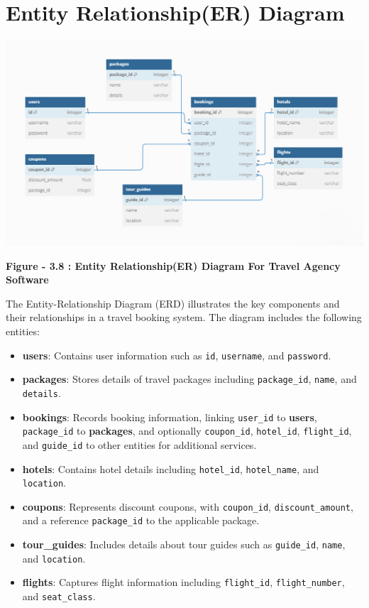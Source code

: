 \documentclass{scrreprt}
\begin{document}
\section{Entity Relationship(ER) Diagram}

{\includegraphics[width=\textwidth]{erd.png}}

\begin{center}
    \parbox{0.8\textwidth}{ 
        \centering
        \textbf{Figure - 3.8 : Entity Relationship(ER) Diagram For Travel Agency Software}
    }
\end{center}

The Entity-Relationship Diagram (ERD) illustrates the key components and their relationships in a travel booking system. The diagram includes the following entities:

\begin{itemize}
    \item \textbf{users}: Contains user information such as \texttt{id}, \texttt{username}, and \texttt{password}.
    \item \textbf{packages}: Stores details of travel packages including \texttt{package\_id}, \texttt{name}, and \texttt{details}.
    \item \textbf{bookings}: Records booking information, linking \texttt{user\_id} to \textbf{users}, \texttt{package\_id} to \textbf{packages}, and optionally \texttt{coupon\_id}, \texttt{hotel\_id}, \texttt{flight\_id}, and \texttt{guide\_id} to other entities for additional services.
    \item \textbf{hotels}: Contains hotel details including \texttt{hotel\_id}, \texttt{hotel\_name}, and \texttt{location}.
    \item \textbf{coupons}: Represents discount coupons, with \texttt{coupon\_id}, \texttt{discount\_amount}, and a reference \texttt{package\_id} to the applicable package.
    \item \textbf{tour\_guides}: Includes details about tour guides such as \texttt{guide\_id}, \texttt{name}, and \texttt{location}.
    \item \textbf{flights}: Captures flight information including \texttt{flight\_id}, \texttt{flight\_number}, and \texttt{seat\_class}.
\end{itemize}
\end{document}
